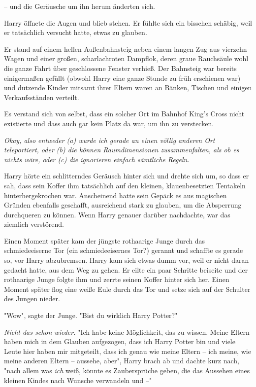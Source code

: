 {-- und die Geräusche um ihn herum änderten sich.

Harry öffnete die Augen und blieb stehen. Er fühlte sich ein bisschen schäbig, weil er tatsächlich versucht hatte, etwas zu glauben.

Er stand auf einem hellen Außenbahnsteig neben einem langen Zug aus vierzehn Wagen und einer großen, scharlachroten Dampflok, deren graue Rauchsäule wohl die ganze Fahrt über geschlossene Fenster verhieß. Der Bahnsteig war bereits einigermaßen gefüllt (obwohl Harry eine ganze Stunde zu früh erschienen war) und dutzende Kinder mitsamt ihrer Eltern waren an Bänken, Tischen und einigen Verkaufsständen verteilt.

Es verstand sich von selbst, dass ein solcher Ort im Bahnhof King's Cross nicht existierte und dass auch gar kein Platz da war, um ihn zu verstecken.

\emph{Okay, also entweder (a) wurde ich gerade an einen völlig anderen Ort teleportiert, oder (b) die können Raumdimensionen zusammenfalten, als ob es nichts wäre, oder (c) die ignorieren einfach sämtliche Regeln.}

Harry hörte ein schlitterndes Geräusch hinter sich und drehte sich um, so dass er sah, dass sein Koffer ihm tatsächlich auf den kleinen, klauenbesetzten Tentakeln hinterhergekrochen war. Anscheinend hatte sein Gepäck es aus magischen Gründen ebenfalls geschafft, ausreichend stark zu glauben, um die Absperrung durchqueren zu können. Wenn Harry genauer darüber nachdachte, war das ziemlich verstörend.

Einen Moment später kam der jüngste rothaarige Junge durch das schmiedeeiserne Tor (ein schmiedeeisernes Tor?) gerannt und schaffte es gerade so, vor Harry abzubremsen. Harry kam sich etwas dumm vor, weil er nicht daran gedacht hatte, aus dem Weg zu gehen. Er eilte ein paar Schritte beiseite und der rothaarige Junge folgte ihm und zerrte seinen Koffer hinter sich her. Einen Moment später flog eine weiße Eule durch das Tor und setze sich auf der Schulter des Jungen nieder.

"Wow", sagte der Junge. "Bist du wirklich Harry Potter?"

\emph{Nicht das schon wieder.} "Ich habe keine Möglichkeit, das zu wissen. Meine Eltern haben mich in dem Glauben aufgezogen, dass ich Harry Potter bin und viele Leute hier haben mir mitgeteilt, dass ich genau wie meine Eltern -- ich meine, wie meine anderen Eltern -- aussehe, aber", Harry brach ab und dachte kurz nach, "nach allem was \emph{ich} weiß, könnte es Zaubersprüche geben, die das Aussehen eines kleinen Kindes nach Wunsche verwandeln und --"

}
